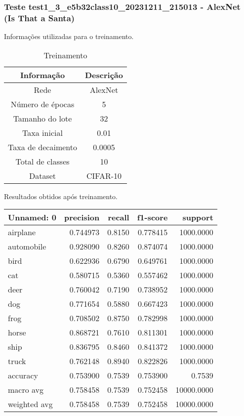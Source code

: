 \subsubsection{Teste test1_3_e5b32class10_20231211_215013 - AlexNet (Is That a Santa)}

Informações utilizadas para o treinamento.

\begin{table}[ht]
   \centering
   \caption{Treinamento}
   \label{tab:modelos}
   \begin{tabular}{| c | c | }
      \hline 
      \textbf{Informação} & \textbf{Descrição} \\
      \hline \hline 
      Rede & AlexNet \\
      \hline
      Número de épocas & 5\\
      \hline
      Tamanho do lote & 32\\
      \hline
      Taxa inicial & 0.01 \\
      \hline
      Taxa de decaimento & 0.0005 \\
      \hline
      Total de classes & 10\\
      \hline
      Dataset & CIFAR-10\\
      \hline
   \end{tabular} 
\end{table}

Resultados obtidos após treinamento.

\begin{tabular}{lrrrr}
\toprule
  Unnamed: 0 &  precision &  recall &  f1-score &    support \\
\midrule
    airplane &   0.744973 &  0.8150 &  0.778415 &  1000.0000 \\
  automobile &   0.928090 &  0.8260 &  0.874074 &  1000.0000 \\
        bird &   0.622936 &  0.6790 &  0.649761 &  1000.0000 \\
         cat &   0.580715 &  0.5360 &  0.557462 &  1000.0000 \\
        deer &   0.760042 &  0.7190 &  0.738952 &  1000.0000 \\
         dog &   0.771654 &  0.5880 &  0.667423 &  1000.0000 \\
        frog &   0.708502 &  0.8750 &  0.782998 &  1000.0000 \\
       horse &   0.868721 &  0.7610 &  0.811301 &  1000.0000 \\
        ship &   0.836795 &  0.8460 &  0.841372 &  1000.0000 \\
       truck &   0.762148 &  0.8940 &  0.822826 &  1000.0000 \\
    accuracy &   0.753900 &  0.7539 &  0.753900 &     0.7539 \\
   macro avg &   0.758458 &  0.7539 &  0.752458 & 10000.0000 \\
weighted avg &   0.758458 &  0.7539 &  0.752458 & 10000.0000 \\
\bottomrule
\end{tabular}


